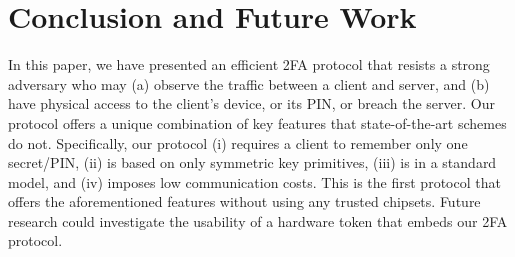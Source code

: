 

\section{Conclusion and Future Work}

In this paper, we have presented an efficient 2FA protocol that resists a strong adversary who may (a) observe the traffic between a client and server, and (b) have physical access to the client’s device, or its PIN, or breach the server. Our protocol offers a unique combination of key features that state-of-the-art schemes do not. Specifically,  our protocol (i) requires a client to remember only one secret/PIN, (ii) is based on only symmetric key primitives, (iii) is in a standard model, and (iv) imposes low communication costs. This is the first protocol that offers the aforementioned features without using any trusted chipsets. Future research could investigate the usability of a hardware token that embeds our 2FA protocol. 

